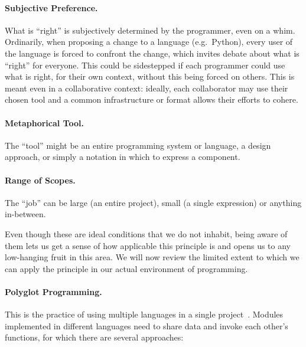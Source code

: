 \paragraph{Subjective Preference.}

What is ``right'' is subjectively determined by the programmer, even on
a whim. Ordinarily, when proposing a change to a language (e.g.~Python),
every user of the language is forced to confront the change, which
invites debate about what is ``right'' for everyone. This could be
sidestepped if each programmer could use what is right, for their own
context, without this being forced on others. This is meant even in a
collaborative context: ideally, each collaborator may use their chosen
tool and a common infrastructure or format allows their efforts to
cohere.

\paragraph{Metaphorical Tool.}

The ``tool'' might be an entire programming system or language, a design
approach, or simply a notation in which to express a component.

\paragraph{Range of Scopes.}

The ``job'' can be large (an entire project), small (a single
expression) or anything in-between.

Even though these are ideal conditions that we do not inhabit, being
aware of them lets us get a sense of how applicable this principle is
and opens us to any low-hanging fruit in this area. We will now review
the limited extent to which we can apply the principle in our actual
environment of programming.

\paragraph{Polyglot Programming.}

This is the practice of using multiple languages in a single
project~\cite{Polyglot}. Modules implemented in different languages need
to share data and invoke each other's functions, for which there are
several approaches:

